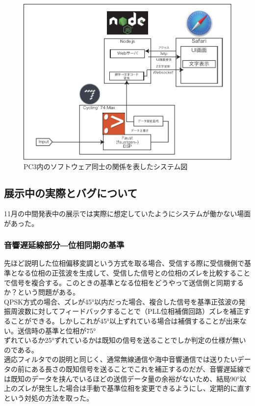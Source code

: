 \documentclass[a4paper,report]{jsbook}
\begin{document}
\begin{no-prefix-figure-caption}

\begin{figure}[htbp]
\centering
\includegraphics[width=1.00000\textwidth]{./img/qam2speech_diagram.pdf}
\caption{PC3内のソフトウェア同士の関係を表したシステム図}
\end{figure}

\end{no-prefix-figure-caption}

\subsection{展示中の実際とバグについて}\label{ux5c55ux793aux4e2dux306eux5b9fux969bux3068ux30d0ux30b0ux306bux3064ux3044ux3066}

11月の中間発表中の展示では実際に想定していたようにシステムが働かない場面があった。

\subsubsection{音響遅延線部分―位相同期の基準}\label{ux97f3ux97ffux9045ux5ef6ux7ddaux90e8ux5206ux4f4dux76f8ux540cux671fux306eux57faux6e96}

先ほど説明した位相偏移変調という方式を取る場合、受信する際に受信機側で基準となる位相の正弦波を生成して、受信した信号との位相のズレを比較することで信号を複合する。このときの基準となる位相をどうやって送信側と同期するか？という問題がある。\\
QPSK方式の場合、ズレが45°以内だった場合、複合した信号を基準正弦波の発振周波数に対してフィードバックすることで（PLL位相補償回路）ズレを補正することができる。しかしこれが45°以上ずれている場合は補償することが出来ない。送信時の基準と位相が75°\\
ずれているか25°ずれているかは既知の信号を送ることでしか判定の仕様が無いのである。\\
適応フィルタでの説明と同じく、通常無線通信や海中音響通信では送りたいデータの前にある長さの既知信号を送ることでこれを補正するのだが、音響遅延線では既知のデータを挟んでいるほどの送信データ量の余裕がないため、結局90°以上のズレが発生した場合は手動で基準位相を変更できるようにし、定期的に直すという対処の方法を取った。
\end{document}
